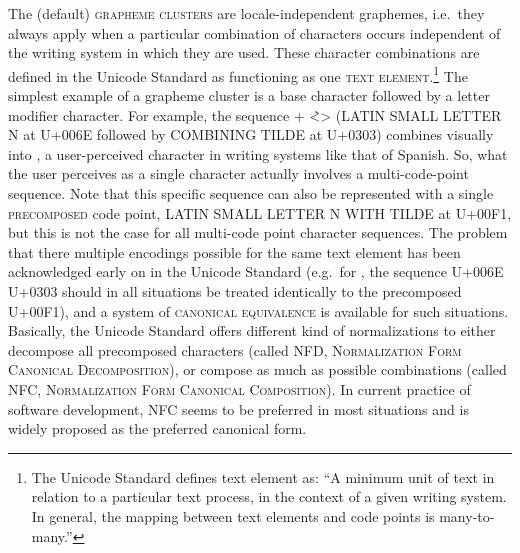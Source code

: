 The (default) \textsc{grapheme clusters} are locale-independent graphemes, i.e.~they always apply when a particular combination of characters occurs independent of the writing system in which they are used. These character combinations are defined in the Unicode Standard as functioning as one \textsc{text element}.\footnote{The Unicode Standard defines text element as: ``A minimum unit of text in relation to a particular text process, in the context of a given writing system. In general, the mapping between text elements and code points is many-to-many.''} The simplest example of a grapheme cluster is a base character followed by a letter modifier character. For example, the sequence + <̃\textgreater{} (LATIN SMALL LETTER N at U+006E followed by COMBINING TILDE at U+0303) combines visually into , a user-perceived character in writing systems like that of Spanish. So, what the user perceives as a single character actually involves a multi-code-point sequence. Note that this specific sequence can also be represented with a single \textsc{precomposed} code point, LATIN SMALL LETTER N WITH TILDE at U+00F1, but this is not the case for all multi-code point character sequences. The problem that there multiple encodings possible for the same text element has been acknowledged early on in the Unicode Standard (e.g.~for , the sequence U+006E U+0303 should in all situations be treated identically to the precomposed U+00F1), and a system of \textsc{canonical equivalence} is available for such situations. Basically, the Unicode Standard offers different kind of normalizations to either decompose all precomposed characters (called \textsc{NFD}, \textsc{Normalization Form Canonical Decomposition}), or compose as much as possible combinations (called \textsc{NFC}, \textsc{Normalization Form Canonical Composition}). In current practice of software development, NFC seems to be preferred in most situations and is widely proposed as the preferred canonical form.

